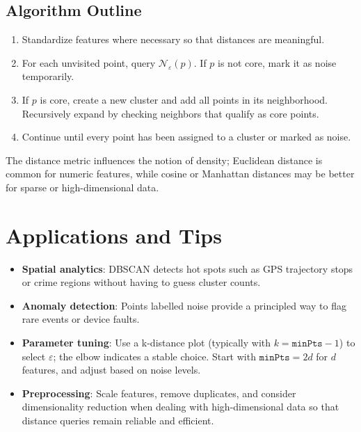 ﻿\documentclass[12pt]{article}
\begin{document}
\subsection{Algorithm Outline}
\begin{enumerate}
  \item Standardize features where necessary so that distances are meaningful.
  \item For each unvisited point, query \(\mathcal{N}_\varepsilon(p)\). If \(p\) is not core, mark it as noise temporarily.
  \item If \(p\) is core, create a new cluster and add all points in its neighborhood. Recursively expand by checking neighbors that qualify as core points.
  \item Continue until every point has been assigned to a cluster or marked as noise.
\end{enumerate}
The distance metric influences the notion of density; Euclidean distance is common for numeric features, while cosine or Manhattan distances may be better for sparse or high-dimensional data.

\section{Applications and Tips}
\begin{itemize}
  \item \textbf{Spatial analytics}: DBSCAN detects hot spots such as GPS trajectory stops or crime regions without having to guess cluster counts.
  \item \textbf{Anomaly detection}: Points labelled noise provide a principled way to flag rare events or device faults.
  \item \textbf{Parameter tuning}: Use a k-distance plot (typically with \(k = \texttt{minPts}-1\)) to select \(\varepsilon\); the elbow indicates a stable choice. Start with \(\texttt{minPts} = 2d\) for \(d\) features, and adjust based on noise levels.
  \item \textbf{Preprocessing}: Scale features, remove duplicates, and consider dimensionality reduction when dealing with high-dimensional data so that distance queries remain reliable and efficient.
\end{itemize}
\end{document}
